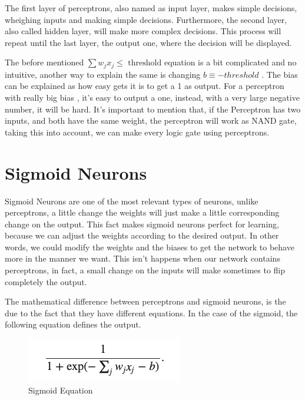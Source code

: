 \documentclass[12pt]{report}
\begin{document}
The first layer of perceptrons, also named as input layer, makes simple decisions, wheighing inputs and making simple decisions. Furthermore, the second layer, also called hidden layer, will make more complex decisions. This process will repeat until the last layer, the output one, where the decision will be displayed. 
\newpage

	The before mentioned $\sum{w_j x_j} \leq \mbox{ threshold}$ equation is a bit complicated and no intuitive, another way to explain the same is changing $ b \equiv -threshold$ . The bias can be explained as how easy gets it is to get a 1 as output. For a perceptron with really big bias , it's easy to output a one, instead, with a very large negative number, it will be hard. 
	It's important to mention that, if the Perceptron has two inputs, and both have the same weight, the perceptron will work as NAND gate, taking this into account, we can make every logic gate using perceptrons. 
 

\section{Sigmoid Neurons}
Sigmoid Neurons are one of the most relevant types of neurons, unlike perceptrons, a little change  the weights will just make a little corresponding change on the output. This fact makes sigmoid neurons perfect for learning, because we can adjust the weights according to the desired output. In other words, we could modify the weights and the biases to get the network to behave more in the manner we want. This isn't happens when our network contains perceptrons, in fact, a small change on the inputs will make sometimes to flip completely the output. 

The mathematical difference between perceptrons and sigmoid neurons, is the due to the  fact that they have different equations. In the case of the sigmoid, the following equation defines the output.
\begin{figure}[h]
  \caption{Sigmoid Equation}
  \centering
      \includegraphics[scale=0.5]{Resources/SigmoidEquation}
\end{figure}
	
\end{document}
